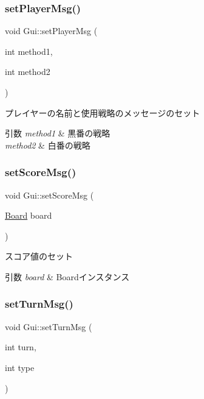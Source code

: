 \subsubsection{\texorpdfstring{set\+Player\+Msg()}{setPlayerMsg()}}
{\footnotesize\ttfamily void Gui\+::set\+Player\+Msg (\begin{DoxyParamCaption}\item[{int}]{method1,  }\item[{int}]{method2 }\end{DoxyParamCaption})\hspace{0.3cm}{\ttfamily [inline]}}



プレイヤーの名前と使用戦略のメッセージのセット 


\begin{DoxyParams}{引数}
{\em method1} & 黒番の戦略 \\
\hline
{\em method2} & 白番の戦略 \\
\hline
\end{DoxyParams}
\mbox{\label{class_gui_aadfc89252ff18f6a26b1eb4a99090c9a}} 
\subsubsection{\texorpdfstring{set\+Score\+Msg()}{setScoreMsg()}}
{\footnotesize\ttfamily void Gui\+::set\+Score\+Msg (\begin{DoxyParamCaption}\item[{\mbox{\hyperlink{class_board}{Board}}}]{board }\end{DoxyParamCaption})\hspace{0.3cm}{\ttfamily [inline]}}



スコア値のセット 


\begin{DoxyParams}{引数}
{\em board} & Boardインスタンス \\
\hline
\end{DoxyParams}
\mbox{\label{class_gui_a90f07e09f9c4a36d9708342713ef4662}} 
\subsubsection{\texorpdfstring{set\+Turn\+Msg()}{setTurnMsg()}}
{\footnotesize\ttfamily void Gui\+::set\+Turn\+Msg (\begin{DoxyParamCaption}\item[{int}]{turn,  }\item[{int}]{type }\end{DoxyParamCaption})\hspace{0.3cm}{\ttfamily [inline]}}



